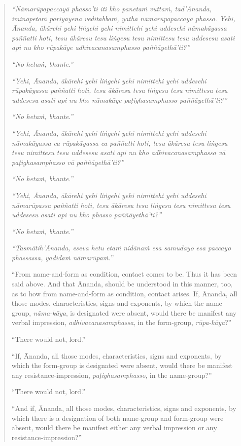 \begin{quote}
\emph{``Nāmarūpapaccayā phasso'ti iti kho panetaṁ vuttaṁ, tad'Ānanda, imināpetaṁ pariyāyena veditabbaṁ, yathā nāmarūpapaccayā phasso. Yehi, Ānanda, ākārehi yehi liṅgehi yehi nimittehi yehi uddesehi nāmakāyassa paññatti hoti, tesu ākāresu tesu liṅgesu tesu nimittesu tesu uddesesu asati api nu kho rūpakāye adhivacanasamphasso paññāyethā'ti?''}

\emph{``No hetaṁ, bhante.''}

\emph{``Yehi, Ānanda, ākārehi yehi liṅgehi yehi nimittehi yehi uddesehi rūpakāyassa paññatti hoti, tesu ākāresu tesu liṅgesu tesu nimittesu tesu uddesesu asati api nu kho nāmakāye paṭighasamphasso paññāyethā'ti?''}

\emph{``No hetaṁ, bhante.''}

\emph{``Yehi, Ānanda, ākārehi yehi liṅgehi yehi nimittehi yehi uddesehi nāmakāyassa ca rūpakāyassa ca paññatti hoti, tesu ākāresu tesu liṅgesu tesu nimittesu tesu uddesesu asati api nu kho adhivacanasamphasso vā paṭighasamphasso vā paññāyethā'ti?''}

\emph{``No hetaṁ, bhante.''}

\emph{``Yehi, Ānanda, ākārehi yehi liṅgehi yehi nimittehi yehi uddesehi nāmarūpassa paññatti hoti, tesu ākāresu tesu liṅgesu tesu nimittesu tesu uddesesu asati api nu kho phasso paññāyethā'ti?''}

\emph{``No hetaṁ, bhante.''}

\emph{``Tasmātih'Ānanda, eseva hetu etaṁ nidānaṁ esa samudayo esa paccayo phassassa, yadidaṁ nāmarūpaṁ.''}

``From name-and-form as condition, contact comes to be. Thus it has been said above. And that Ānanda, should be understood in this manner, too, as to how from name-and-form as condition, contact arises. If, Ānanda, all those modes, characteristics, signs and exponents, by which the name-group, \emph{nāma-kāya}, is designated were absent, would there be manifest any verbal impression, \emph{adhivacanasamphassa}, in the form-group, \emph{rūpa-kāya}?''

``There would not, lord.''

``If, Ānanda, all those modes, characteristics, signs and exponents, by which the form-group is designated were absent, would there be manifest any resistance-impression, \emph{paṭighasamphasso}, in the name-group?''

``There would not, lord.''

``And if, Ānanda, all those modes, characteristics, signs and exponents, by which there is a designation of both name-group and form-group were absent, would there be manifest either any verbal impression or any resistance-impression?''


\end{quote}
